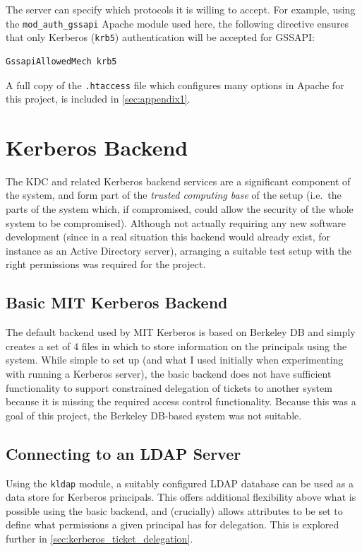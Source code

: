 \documentclass[12pt]{report}
\begin{document}
The server can specify which protocols it is willing to accept. For example, using the \verb+mod_auth_gssapi+ Apache module used here, the following directive ensures that only Kerberos (\texttt{krb5}) authentication will be accepted for GSSAPI:

\begin{verbatim}
GssapiAllowedMech krb5
\end{verbatim}

A full copy of the \verb+.htaccess+ file which configures many options in Apache for this project, is included in \autoref{sec:appendix1}.

\section{Kerberos Backend}
The KDC and related Kerberos backend services are a significant component of the system, and form part of the \textit{trusted computing base} of the setup (i.e.\ the parts of the system which, if compromised, could allow the security of the whole system to be compromised). Although not actually requiring any new software development (since in a real situation this backend would already exist, for instance as an Active Directory server), arranging a suitable test setup with the right permissions was required for the project.

\subsection{Basic MIT Kerberos Backend}
The default backend used by MIT Kerberos is based on Berkeley DB and simply creates a set of 4 files in which to store information on the principals using the system\cite{KDC-database-docs}. While simple to set up (and what I used initially when experimenting with running a Kerberos server), the basic backend does not have sufficient functionality to support constrained delegation of tickets to another system because it is missing the required access control functionality\cite{KRB-DELEG}. Because this was a goal of this project, the Berkeley DB-based system was not suitable.

\subsection{Connecting to an LDAP Server}
Using the \texttt{kldap} module, a suitably configured LDAP database can be used as a data store for Kerberos principals. This offers additional flexibility above what is possible using the basic backend, and (crucially) allows attributes to be set to define what permissions a given principal has for delegation. This is explored further in \autoref{sec:kerberos_ticket_delegation}.
\end{document}

